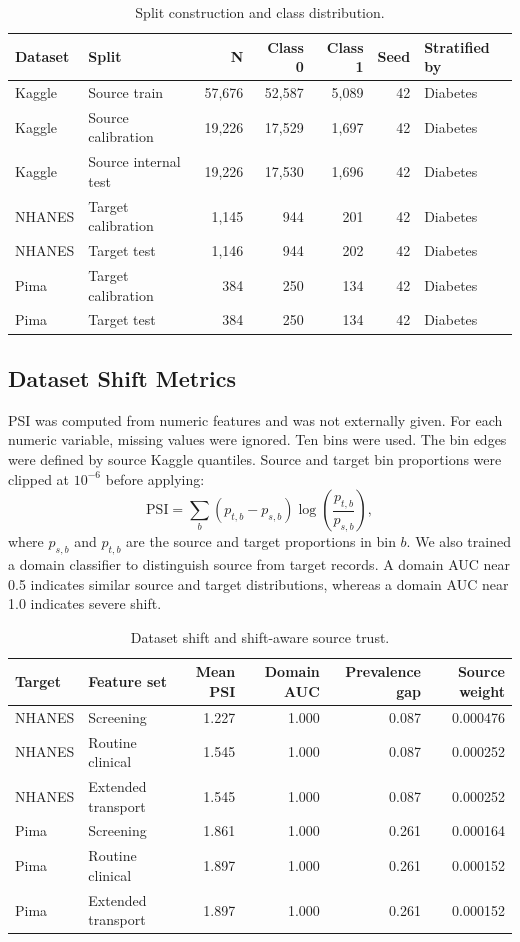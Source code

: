 \documentclass{ieeeaccess}
\begin{document}
\begin{table}[!t]
\centering
\caption{Split construction and class distribution.}
\label{tab:splits}
\begin{tabular}{llrrrrl}
\toprule
Dataset & Split & N & Class 0 & Class 1 & Seed & Stratified by \\
\midrule
Kaggle & Source train & 57,676 & 52,587 & 5,089 & 42 & Diabetes \\
Kaggle & Source calibration & 19,226 & 17,529 & 1,697 & 42 & Diabetes \\
Kaggle & Source internal test & 19,226 & 17,530 & 1,696 & 42 & Diabetes \\
NHANES & Target calibration & 1,145 & 944 & 201 & 42 & Diabetes \\
NHANES & Target test & 1,146 & 944 & 202 & 42 & Diabetes \\
Pima & Target calibration & 384 & 250 & 134 & 42 & Diabetes \\
Pima & Target test & 384 & 250 & 134 & 42 & Diabetes \\
\bottomrule
\end{tabular}
\end{table}

\subsection{Dataset Shift Metrics}
PSI was computed from numeric features and was not externally given. For each numeric variable, missing values were ignored. Ten bins were used. The bin edges were defined by source Kaggle quantiles. Source and target bin proportions were clipped at $10^{-6}$ before applying:
\begin{equation}
\mathrm{PSI}=\sum_b (p_{t,b}-p_{s,b})\log\left(\frac{p_{t,b}}{p_{s,b}}\right),
\end{equation}
where $p_{s,b}$ and $p_{t,b}$ are the source and target proportions in bin $b$. We also trained a domain classifier to distinguish source from target records. A domain AUC near 0.5 indicates similar source and target distributions, whereas a domain AUC near 1.0 indicates severe shift.

\begin{table}[!t]
\centering
\caption{Dataset shift and shift-aware source trust.}
\label{tab:source_trust}
\begin{tabular}{llrrrr}
\toprule
Target & Feature set & Mean PSI & Domain AUC & Prevalence gap & Source weight \\
\midrule
NHANES & Screening & 1.227 & 1.000 & 0.087 & 0.000476 \\
NHANES & Routine clinical & 1.545 & 1.000 & 0.087 & 0.000252 \\
NHANES & Extended transport & 1.545 & 1.000 & 0.087 & 0.000252 \\
Pima & Screening & 1.861 & 1.000 & 0.261 & 0.000164 \\
Pima & Routine clinical & 1.897 & 1.000 & 0.261 & 0.000152 \\
Pima & Extended transport & 1.897 & 1.000 & 0.261 & 0.000152 \\
\bottomrule
\end{tabular}
\end{table}
\end{document}
